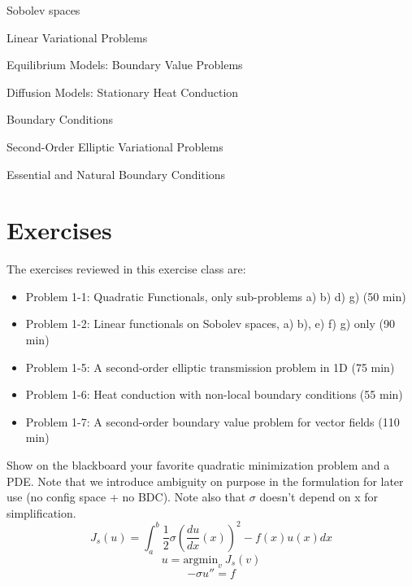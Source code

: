 




\begin{Theory}
\item Sobolev spaces
\item Linear Variational Problems
\item Equilibrium Models: Boundary Value Problems
\item Diffusion Models: Stationary Heat Conduction
\item Boundary Conditions
\item Second-Order Elliptic Variational Problems
\item Essential and Natural Boundary Conditions
\end{Theory}

\section*{Exercises}

The exercises reviewed in this exercise class are:
\begin{itemize}
    \item Problem 1-1: Quadratic Functionals, only sub-problems a) b) d) g) (50 min)
    \item Problem 1-2: Linear functionals on Sobolev spaces, a) b), e) f) g) only (90 min)
    \item Problem 1-5: A second-order elliptic transmission problem in 1D (75 min)
    \item Problem 1-6: Heat conduction with non-local boundary conditions (55 min)
    \item Problem 1-7: A second-order boundary value problem for vector fields (110 min)
\end{itemize}



\tableofcontents

\newpage



Show on the blackboard your favorite quadratic minimization problem and a PDE. Note that we introduce ambiguity on purpose in the formulation for later use (no config space + no BDC). Note also that $\sigma$ doesn't depend on x for simplification.
\begin{equation}
    J_s(u) = \int_a^b \frac{1}{2}\sigma (\frac{du}{dx}(x))^2 - f(x)u(x) dx
\end{equation}
\begin{equation}
    u = \text{argmin}_v \ J_s(v)
\end{equation}
\begin{equation}
    -\sigma  u'' = f
\end{equation}

